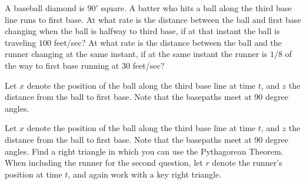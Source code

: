 \begin{activity} \label{A:3.1.4}  
A baseball diamond is $90'$ square.  A batter who hits a ball along the third base line runs to first base.  At what rate is the distance between the ball and first base changing when the ball is halfway to third base, if at that instant the ball is traveling $100$ feet/sec?  At what rate is the distance between the ball and the runner changing at the same instant, if at the same instant the runner is $1/8$ of the way to first base running at $30$ feet/sec?
\end{activity}
\begin{smallhint}
Let $x$ denote the position of the ball along the third base line at time $t$, and $z$ the distance from the ball to first base.  Note that the basepaths meet at 90 degree angles.
\end{smallhint}
\begin{bighint}
Let $x$ denote the position of the ball along the third base line at time $t$, and $z$ the distance from the ball to first base.  Note that the basepaths meet at 90 degree angles.  Find a right triangle in which you can use the Pythagorean Theorem.  When including the runner for the second question, let $r$ denote the runner's position at time $t$, and again work with a key right triangle.
\end{bighint}

